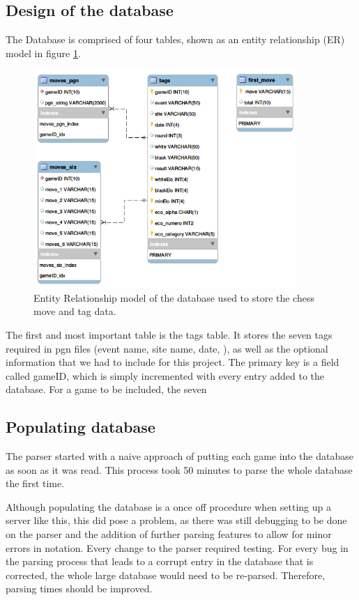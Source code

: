 \documentclass{article}
\begin{document}
\subsection{Design of the database}
The Database is comprised of four tables, shown as an entity relationship
(ER) model in figure \ref{figure:4}. 

\begin{figure}[h]
	\includegraphics[width=10cm]{EER}
	\caption{Entity Relationship model of the database used to store the
	chess move and tag data.}
	\label{figure:4}
\end{figure}

The first and most important table is the tags table.  It stores the seven
tags required in pgn files (event name, site name, date, 
), as well as the optional information that we had
to include for this project.  The primary key is a field called gameID,
which is simply incremented with every entry added to the database.  For a
game to be included, the seven 


\subsection{Populating database}
The parser started with a naive approach of putting each game into the
database as soon as it was read.  This process took 50 minutes to parse the
whole database the first time.

Although populating the database is a once
off procedure when setting up a server like this, this did pose a problem,
as there was still debugging to be done on the parser and the addition of
further parsing features to allow for minor errors in notation. Every change to
the parser required testing.  For every bug in the parsing process that leads
to a corrupt entry in the database that is corrected, the whole large database
would need to be re-parsed.  Therefore, parsing times should be improved.
\end{document}
